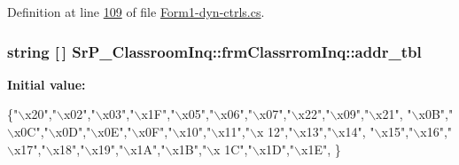\-Definition at line \hyperlink{_form1-dyn-ctrls_8cs_source_l00109}{109} of file \hyperlink{_form1-dyn-ctrls_8cs_source}{\-Form1-\/dyn-\/ctrls.\-cs}.

\hypertarget{class_sr_p___classroom_inq_1_1frm_classrrom_inq_a0f417902be6534cb30d93b2c0d836165}{
\subsubsection[{addr\-\_\-tbl}]{\setlength{\rightskip}{0pt plus 5cm}string \mbox{[}$\,$\mbox{]} {\bf \-Sr\-P\-\_\-\-Classroom\-Inq\-::frm\-Classrrom\-Inq\-::addr\-\_\-tbl}}}
\label{class_sr_p___classroom_inq_1_1frm_classrrom_inq_a0f417902be6534cb30d93b2c0d836165}
{\bfseries \-Initial value\-:}
\begin{DoxyCode}
 \{\textcolor{stringliteral}{"\(\backslash\)x20"},\textcolor{stringliteral}{"\(\backslash\)x02"},\textcolor{stringliteral}{"\(\backslash\)x03"},\textcolor{stringliteral}{"\(\backslash\)x1F"},\textcolor{stringliteral}{"\(\backslash\)x05"},\textcolor{stringliteral}{"\(\backslash\)x06"},\textcolor{stringliteral}{"\(\backslash\)x07"},\textcolor{stringliteral}{"\(\backslash\)x22"},\textcolor{stringliteral}{"\(\backslash\)x09"},\textcolor{stringliteral}{"\(\backslash\)x21"},
                           \textcolor{stringliteral}{"\(\backslash\)x0B"},\textcolor{stringliteral}{"\(\backslash\)x0C"},\textcolor{stringliteral}{"\(\backslash\)x0D"},\textcolor{stringliteral}{"\(\backslash\)x0E"},\textcolor{stringliteral}{"\(\backslash\)x0F"},\textcolor{stringliteral}{"\(\backslash\)x10"},\textcolor{stringliteral}{"\(\backslash\)x11"},\textcolor{stringliteral}{"\(\backslash\)x
      12"},\textcolor{stringliteral}{"\(\backslash\)x13"},\textcolor{stringliteral}{"\(\backslash\)x14"},
                           \textcolor{stringliteral}{"\(\backslash\)x15"},\textcolor{stringliteral}{"\(\backslash\)x16"},\textcolor{stringliteral}{"\(\backslash\)x17"},\textcolor{stringliteral}{"\(\backslash\)x18"},\textcolor{stringliteral}{"\(\backslash\)x19"},\textcolor{stringliteral}{"\(\backslash\)x1A"},\textcolor{stringliteral}{"\(\backslash\)x1B"},\textcolor{stringliteral}{"\(\backslash\)x
      1C"},\textcolor{stringliteral}{"\(\backslash\)x1D"},\textcolor{stringliteral}{"\(\backslash\)x1E"},
                            \}
\end{DoxyCode}


